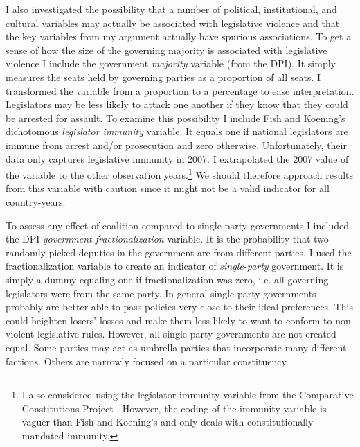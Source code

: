 \documentclass[a4paper]{article}\usepackage[]{graphicx}\usepackage[]{color}
\begin{document}
I also investigated the possibility that a number of political, institutional, and cultural variables may actually be associated with legislative violence and that the key variables from my argument actually have spurious associations. To get a sense of how the size of the governing majority is associated with legislative violence I include the government {\emph{majority}} variable (from the DPI). It simply measures the seats held by governing parties as a proportion of all seats. I transformed the variable from a proportion to a percentage to ease interpretation. Legislators may be less likely to attack one another if they know that they could be arrested for assault. To examine this possibility I include Fish and Koening's \citeyearpar{Fish2009} dichotomous \emph{legislator immunity} variable. It equals one if national legislators are immune from arrest and/or prosecution and zero otherwise. Unfortunately, their data only captures legislative immunity in 2007. I extrapolated the 2007 value of the variable to the other observation years.\footnote{I also considered using the legislator immunity variable from the Comparative Constitutions Project \citep{ElkinsCCP2010}. However, the coding of the immunity variable is vaguer than Fish and Koening's and only deals with constitutionally mandated immunity.} We should therefore approach results from this variable with caution since it might not be a valid indicator for all country-years.

To assess any effect of coalition compared to single-party governments I included the DPI {\emph{government fractionalization}} variable. It is the probability that two randomly picked deputies in the government are from different parties. I used the fractionalization variable to create an indicator of {\emph{single-party}} government. It is simply a dummy equaling one if fractionalization was zero, i.e. all governing legislators were from the same party. In general single party governments probably are better able to pass policies very close to their ideal preferences. This could heighten losers' losses and make them less likely to want to conform to non-violent legislative rules. However, all single party governments are not created equal. Some parties may act as umbrella parties that incorporate many different factions. Others are narrowly focused on a particular constituency.
\end{document}
